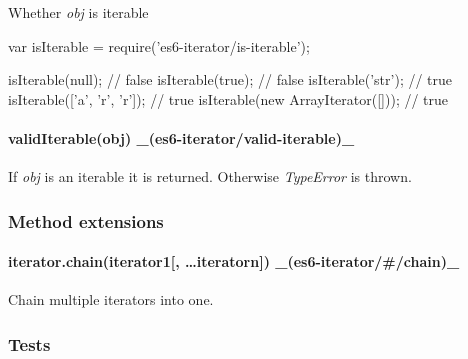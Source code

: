 Whether {\itshape obj} is iterable


\begin{DoxyCode}
var isIterable = require('es6-iterator/is-iterable');

isIterable(null); // false
isIterable(true); // false
isIterable('str'); // true
isIterable(['a', 'r', 'r']); // true
isIterable(new ArrayIterator([])); // true
\end{DoxyCode}


\paragraph*{valid\+Iterable(obj) \+\_\+(es6-\/iterator/valid-\/iterable)\+\_\+}

If {\itshape obj} is an iterable it is returned. Otherwise {\itshape Type\+Error} is thrown.

\subsubsection*{Method extensions}

\paragraph*{iterator.\+chain(iterator1\mbox{[}, …iteratorn\mbox{]}) \+\_\+(es6-\/iterator/\#/chain)\+\_\+}

Chain multiple iterators into one.

\subsubsection*{Tests \href{https://travis-ci.org/medikoo/es6-iterator}{\tt }}

 
